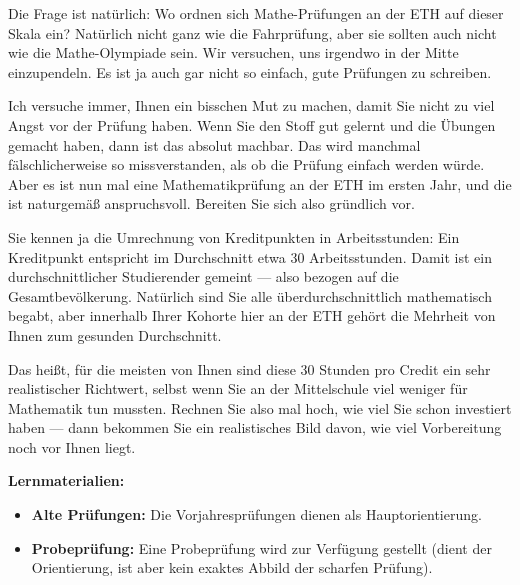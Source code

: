 \begin{ai-global-state-checkpoint-invisible-content}
\end{ai-global-state-checkpoint-invisible-content}

\begin{spoken-clean}[01:18:09 - 01:20:39]
Die Frage ist natürlich: Wo ordnen sich Mathe-Prüfungen an der ETH auf dieser Skala ein? Natürlich nicht ganz wie die Fahrprüfung, aber sie sollten auch nicht wie die Mathe-Olympiade sein. Wir versuchen, uns irgendwo in der Mitte einzupendeln. Es ist ja auch gar nicht so einfach, gute Prüfungen zu schreiben.

Ich versuche immer, Ihnen ein bisschen Mut zu machen, damit Sie nicht zu viel Angst vor der Prüfung haben. Wenn Sie den Stoff gut gelernt und die Übungen gemacht haben, dann ist das absolut machbar. Das wird manchmal fälschlicherweise so missverstanden, als ob die Prüfung einfach werden würde. Aber es ist nun mal eine Mathematikprüfung an der ETH im ersten Jahr, und die ist naturgemäß anspruchsvoll. Bereiten Sie sich also gründlich vor.

Sie kennen ja die Umrechnung von Kreditpunkten in Arbeitsstunden: Ein Kreditpunkt entspricht im Durchschnitt etwa 30 Arbeitsstunden. Damit ist ein durchschnittlicher Studierender gemeint --- also bezogen auf die Gesamtbevölkerung. Natürlich sind Sie alle überdurchschnittlich mathematisch begabt, aber innerhalb Ihrer Kohorte hier an der ETH gehört die Mehrheit von Ihnen zum gesunden Durchschnitt. 

Das heißt, für die meisten von Ihnen sind diese 30 Stunden pro Credit ein sehr realistischer Richtwert, selbst wenn Sie an der Mittelschule viel weniger für Mathematik tun mussten. Rechnen Sie also mal hoch, wie viel Sie schon investiert haben --- dann bekommen Sie ein realistisches Bild davon, wie viel Vorbereitung noch vor Ihnen liegt.
\end{spoken-clean}

\begin{math-stroke}[Vorbereitungsmaterialien]
\textbf{Lernmaterialien:}
\begin{itemize}
    \item \textbf{Alte Prüfungen:} Die Vorjahresprüfungen dienen als Hauptorientierung.
    \item \textbf{Probeprüfung:} Eine Probeprüfung wird zur Verfügung gestellt (dient der Orientierung, ist aber kein exaktes Abbild der scharfen Prüfung).
\end{itemize}
\end{math-stroke}

